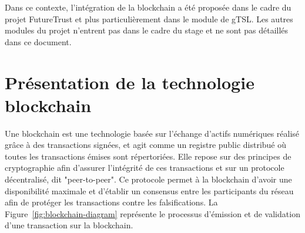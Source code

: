 \documentclass{tnreport}
\begin{document}
Dans ce contexte, l'intégration de la blockchain a été proposée dans le cadre du projet FutureTrust et plus particulièrement dans le module de gTSL. Les autres modules du projet n'entrent pas dans le cadre du stage et ne sont pas détaillés dans ce document. 

\section{Présentation de la technologie blockchain}

Une blockchain est une technologie basée sur l'échange d'actifs numériques réalisé grâce à des transactions signées, et agit comme un registre public distribué où toutes les transactions émises sont répertoriées. Elle repose sur des principes de cryptographie afin d'assurer l'intégrité de ces transactions et sur un protocole décentralisé, dit "peer-to-peer". Ce protocole permet à la blockchain d'avoir une disponibilité maximale et d'établir un consensus entre les participants du réseau afin de protéger les transactions contre les falsifications. La Figure~\ref{fig:blockchain-diagram} représente le processus d'émission et de validation d'une transaction sur la blockchain.
\end{document}
